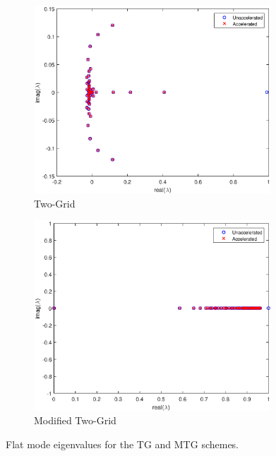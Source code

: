 \begin{figure}
\centering
	\begin{subfigure}[b]{0.775\textwidth}
		\centering
		\includegraphics[width=0.975\textwidth]{figures/sec_DSA/IM1_Graph_FA_TG.eps}
		\caption{Two-Grid}
	\end{subfigure}
	
	\begin{subfigure}[b]{0.775\textwidth}
		\centering
		\includegraphics[width=0.975\textwidth]{figures/sec_DSA/IM1_Graph_FA_MTG.eps}
		\caption{Modified Two-Grid}
	\end{subfigure}
\caption{Flat mode eigenvalues for the TG and MTG schemes.}
\label{fig::IM1_Flat_FA_TGandMTG}
\end{figure}

